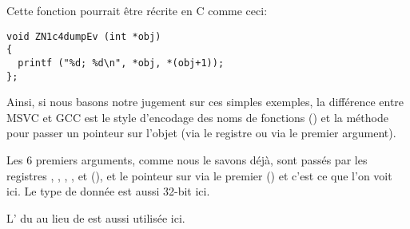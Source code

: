 Cette fonction pourrait être récrite en C comme ceci:

\begin{lstlisting}[style=customc]
void ZN1c4dumpEv (int *obj)
{
  printf ("%d; %d\n", *obj, *(obj+1));
};
\end{lstlisting}

Ainsi, si nous basons notre jugement sur ces simples exemples, la différence entre
MSVC et GCC est le style d'encodage des noms de fonctions () et
la méthode pour passer un pointeur sur l'objet (via le registre \ECX ou via le premier
argument).


Les 6 premiers arguments, comme nous le savons déjà, sont passés par les registres
\RDI, \RSI, \RDX, \RCX,  et  (\SysVABI),
et le pointeur sur \ITthis via le premier (\RDI) et c'est ce que l'on voit ici.
Le type de donnée \Tint est aussi 32-bit ici.

L' du \JMP au lieu de \RET est aussi utilisée ici.



